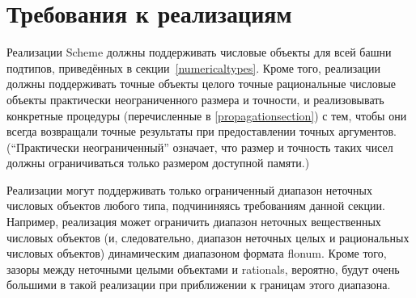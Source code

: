 \section{Требования к реализациям}

\label{restrictions}

Реализации Scheme должны поддерживать числовые объекты для всей башни подтипов, приведённых в
секции~\ref{numericaltypes}. Кроме того, реализации должны поддерживать точные объекты целого
точные рациональные числовые объекты практически неограниченного размера и точности,
и реализовывать конкретные процедуры (перечисленные в \ref{propagationsection}) с тем, чтобы
они всегда возвращали точные результаты при предоставлении точных аргументов. (``Практически
неограниченный'' означает, что размер и точность таких чисел должны
ограничиваться только размером доступной памяти.)

\newpage

Реализации могут поддерживать только ограниченный диапазон неточных числовых объектов любого
типа, подчининяясь требованиям данной секции. Например, реализация может ограничить диапазон
неточных вещественных числовых объектов (и, следовательно, диапазон неточных целых и
рациональных числовых объектов) динамическим диапазоном формата flonum. Кроме того, зазоры
между неточными целыми объектами и rationals, вероятно, будут очень большими в такой
реализации при приближении к границам этого диапазона.

